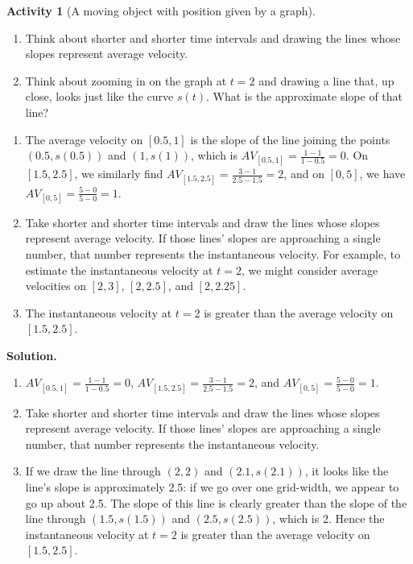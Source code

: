 \documentclass[10pt,]{book}
\theoremstyle{plain}
\theoremstyle{definition}
\theoremstyle{definition}
\theoremstyle{definition}
\theoremstyle{definition}
\newtheorem{activity}[project]{Activity}
\theoremstyle{definition}
\numberwithin{equation}{section}
\begin{document}
\begin{activity}[A moving object with position given by a graph]
\begin{enumerate}[label=\alph*lpha]
\item\hypertarget{li-76}{}Think about shorter and shorter time intervals and drawing the lines whose slopes represent average velocity.%
\item\hypertarget{li-77}{}Think about zooming in on the graph at \(t = 2\) and drawing a line that, up close, looks just like the curve \(s(t)\).  What is the approximate slope of that line?%
\end{enumerate}
\leavevmode%
\begin{enumerate}[label=\alph*lpha]
\item\hypertarget{li-78}{}The average velocity on \([0.5,1]\) is the slope of the line joining the points \((0.5,s(0.5))\) and \((1,s(1))\), which is \(AV_{[0.5,1]} = \frac{1-1}{1-0.5} = 0\).  On \([1.5,2.5]\), we similarly find \(AV_{[1.5,2.5]} = \frac{3-1}{2.5-1.5} = 2\), and on \([0,5]\), we have \(AV_{[0,5]} = \frac{5-0}{5-0} = 1\).%
\item\hypertarget{li-79}{}Take shorter and shorter time intervals and draw the lines whose slopes represent average velocity.  If those lines' slopes are approaching a single number, that number represents the instantaneous velocity.  For example, to estimate the instantaneous velocity at \(t = 2\), we might consider average velocities on \([2,3]\), \([2,2.5]\), and \([2,2.25]\).%
\item\hypertarget{li-80}{}The instantaneous velocity at \(t = 2\) is greater than the average velocity on \([1.5,2.5]\).%
\end{enumerate}
\par\medskip\noindent%
\textbf{Solution.}\quad \leavevmode%
\begin{enumerate}[label=\alph*lpha]
\item\hypertarget{li-81}{}\(AV_{[0.5,1]} = \frac{1-1}{1-0.5} = 0\), \(AV_{[1.5,2.5]} = \frac{3-1}{2.5-1.5} = 2\), and \(AV_{[0,5]} = \frac{5-0}{5-0} = 1\).%
\item\hypertarget{li-82}{}Take shorter and shorter time intervals and draw the lines whose slopes represent average velocity.  If those lines' slopes are approaching a single number, that number represents the instantaneous velocity.%
\item\hypertarget{li-83}{}If we draw the line through \((2,2)\) and \((2.1,s(2.1))\), it looks like the line's slope is approximately 2.5: if we go over one grid-width, we appear to go up about 2.5.  The slope of this line is clearly greater than the slope of the line through \((1.5, s(1.5))\) and \((2.5, s(2.5))\), which is 2. Hence the instantaneous velocity at \(t = 2\) is greater than the average velocity on \([1.5,2.5]\).%
\end{enumerate}
\end{activity}
\typeout{************************************************}
\typeout{************************************************}
\end{document}
